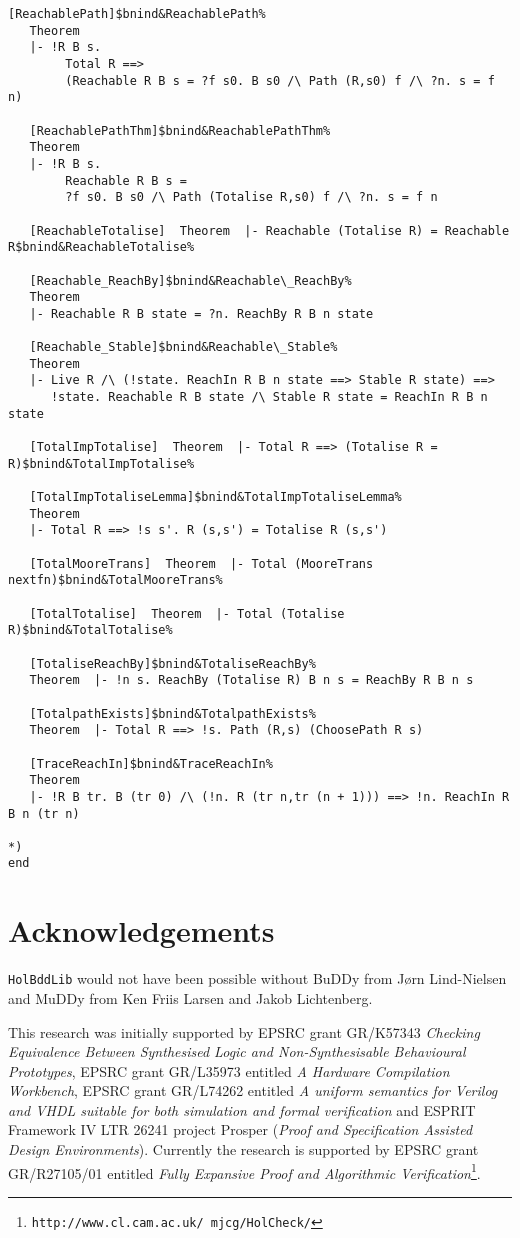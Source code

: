 \documentclass[12pt]{article}
\renewcommand{\t}[1]{\mbox{\tt #1}}
\newcommand{\Buddy}{BuDDy\xspace}
\newcommand{\Muddy}{MuDDy\xspace}
\begin{document}
\begin{footnotesize}
\begin{Verbatim}[commandchars=\$\&\%]
   [ReachablePath]$bnind&ReachablePath%
   Theorem
   |- !R B s.
        Total R ==>
        (Reachable R B s = ?f s0. B s0 /\ Path (R,s0) f /\ ?n. s = f n)
   
   [ReachablePathThm]$bnind&ReachablePathThm%
   Theorem
   |- !R B s.
        Reachable R B s =
        ?f s0. B s0 /\ Path (Totalise R,s0) f /\ ?n. s = f n
   
   [ReachableTotalise]  Theorem  |- Reachable (Totalise R) = Reachable R$bnind&ReachableTotalise%
   
   [Reachable_ReachBy]$bnind&Reachable\_ReachBy%
   Theorem
   |- Reachable R B state = ?n. ReachBy R B n state
   
   [Reachable_Stable]$bnind&Reachable\_Stable%
   Theorem
   |- Live R /\ (!state. ReachIn R B n state ==> Stable R state) ==>
      !state. Reachable R B state /\ Stable R state = ReachIn R B n state
   
   [TotalImpTotalise]  Theorem  |- Total R ==> (Totalise R = R)$bnind&TotalImpTotalise%
   
   [TotalImpTotaliseLemma]$bnind&TotalImpTotaliseLemma%
   Theorem
   |- Total R ==> !s s'. R (s,s') = Totalise R (s,s')
   
   [TotalMooreTrans]  Theorem  |- Total (MooreTrans nextfn)$bnind&TotalMooreTrans%
   
   [TotalTotalise]  Theorem  |- Total (Totalise R)$bnind&TotalTotalise%
   
   [TotaliseReachBy]$bnind&TotaliseReachBy%
   Theorem  |- !n s. ReachBy (Totalise R) B n s = ReachBy R B n s
   
   [TotalpathExists]$bnind&TotalpathExists%
   Theorem  |- Total R ==> !s. Path (R,s) (ChoosePath R s)
   
   [TraceReachIn]$bnind&TraceReachIn%
   Theorem
   |- !R B tr. B (tr 0) /\ (!n. R (tr n,tr (n + 1))) ==> !n. ReachIn R B n (tr n)

*)
end
\end{Verbatim}
\end{footnotesize}

\section*{Acknowledgements}

\t{HolBddLib} would not have been possible without \Buddy from
J{\o}rn Lind-Nielsen and \Muddy from Ken Friis Larsen and Jakob Lichtenberg.

This research was initially supported by EPSRC grant
GR/K57343 {\em Checking Equivalence Between Synthesised Logic and
Non-Synthesisable Behavioural Prototypes}, EPSRC grant GR/L35973
entitled {\it A Hardware Compilation Workbench\/}, EPSRC grant
GR/L74262 entitled {\it A uniform semantics for Verilog and VHDL
suitable for both simulation and formal verification\/} and ESPRIT
Framework IV LTR 26241 project Prosper ({\em Proof and Specification
Assisted Design Environments}). Currently the research is supported by
EPSRC grant GR/R27105/01 entitled {\it Fully Expansive Proof and
Algorithmic Verification\/}\footnote{\texttt{http://www.cl.cam.ac.uk/~mjcg/HolCheck/}}.
\end{document}
